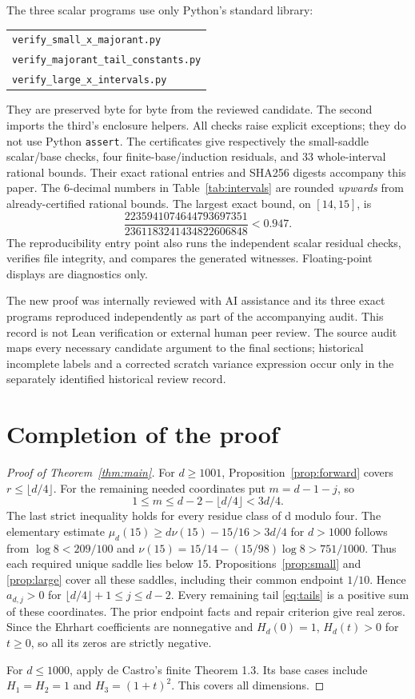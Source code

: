 \documentclass[11pt]{article}
\theoremstyle{remark}\newtheorem{remark}[theorem]{Remark}
\begin{document}
The three scalar programs use only Python's standard library:
\begin{center}\small\begin{tabular}{l}
\texttt{verify\_small\_x\_majorant.py}\\
\texttt{verify\_majorant\_tail\_constants.py}\\
\texttt{verify\_large\_x\_intervals.py}
\end{tabular}\end{center}
They are preserved byte for byte from the reviewed candidate.
The second imports the third's enclosure helpers. All checks raise explicit
exceptions; they do not use Python \texttt{assert}.
The certificates give respectively the small-saddle scalar/base checks,
four finite-base/induction residuals, and 33 whole-interval rational bounds.
Their exact rational entries and SHA256 digests accompany this paper.
The 6-decimal numbers in Table~\ref{tab:intervals} are rounded
\emph{upwards} from already-certified rational bounds.
The largest exact bound, on $[14,15]$, is
\[
 \frac{2235941074644793697351}{2361183241434822606848}<0.947.
\]
The reproducibility entry point also runs the independent scalar residual
checks, verifies file integrity, and compares the generated witnesses.
Floating-point displays are diagnostics only.

The new proof was internally reviewed with AI assistance and its three exact programs reproduced
independently as part of the accompanying audit. This record is not Lean
verification or external human peer review. The source audit maps every
necessary candidate argument to the final sections; historical incomplete
labels and a corrected scratch variance expression occur only in the
separately identified historical review record.

\section{Completion of the proof}\label{sec:completion}
\begin{proof}[Proof of Theorem~\ref{thm:main}]
For $d\ge1001$, Proposition~\ref{prop:forward} covers
$r\le\lfloor d/4\rfloor$. For the remaining needed coordinates put
$m=d-1-j$, so
\[
 1\le m\le d-2-\lfloor d/4\rfloor<3d/4.
\]
The last strict inequality holds for every residue class of d modulo four.
The elementary estimate
$\mu_d(15)\ge d\nu(15)-15/16>3d/4$ for $d>1000$ follows from
$\log8<209/100$ and
$\nu(15)=15/14-(15/98)\log8>751/1000$.
Thus each required unique saddle lies below 15.
Propositions~\ref{prop:small} and \ref{prop:large} cover all these saddles,
including their common endpoint $1/10$.
Hence $a_{d,j}>0$ for $\lfloor d/4\rfloor+1\le j\le d-2$.
Every remaining tail \eqref{eq:tails} is a positive sum of these coordinates.
The prior endpoint facts and repair criterion give real zeros.
Since the Ehrhart coefficients are nonnegative and $H_d(0)=1$,
$H_d(t)>0$ for $t\ge0$, so all its zeros are strictly negative.

For $d\le1000$, apply de Castro's finite Theorem 1.3.
Its base cases include $H_1=H_2=1$ and $H_3=(1+t)^2$.
This covers all dimensions.
\end{proof}
\end{document}
